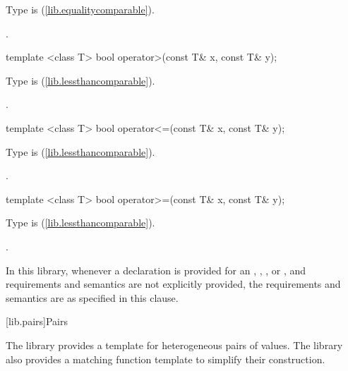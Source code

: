 \begin{itemdescr}
\pnum
\requires
Type  is  (\ref{lib.equalitycomparable}).

\pnum
\returns
{}.
\end{itemdescr}

%
\begin{itemdecl}
template <class T> bool operator>(const T& x, const T& y);
\end{itemdecl}

\begin{itemdescr}
\pnum
\requires
Type  is  (\ref{lib.lessthancomparable}).

\pnum
\returns
{}.
\end{itemdescr}

%
\begin{itemdecl}
template <class T> bool operator<=(const T& x, const T& y);
\end{itemdecl}

\begin{itemdescr}
\pnum
\requires
Type  is  (\ref{lib.lessthancomparable}).

\pnum
\returns
{}.
\end{itemdescr}

%
\begin{itemdecl}
template <class T> bool operator>=(const T& x, const T& y);
\end{itemdecl}

\begin{itemdescr}
\pnum
\requires
Type  is  (\ref{lib.lessthancomparable}).

\pnum
\returns
{}.
\end{itemdescr}

\pnum
In this library, whenever a declaration is provided for an ,
, , or ,
and requirements and semantics are not explicitly provided,
the requirements and semantics are as specified in this clause.

[lib.pairs]{Pairs}

\pnum
The library provides a template for heterogeneous pairs of values.
The library also provides a matching function template to simplify
their construction.%
%

